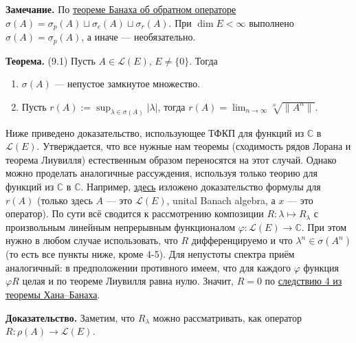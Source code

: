 \documentclass[12pt, a4paper]{article}
\renewcommand{\phi}{\varphi}   %
\begin{document}
\textbf{Замечание.} По \hyperref[th:8-4]{теореме Банаха об обратном операторе} $\sigma(A) = \sigma_p(A) \sqcup \sigma_c(A) \sqcup \sigma_r(A)$. При $\dim E < \infty$ выполнено $\sigma(A) = \sigma_p(A)$, а иначе --- необязательно.

 \label{th:9-1} \textbf{Теорема.} (9.1) Пусть $A \in \mathcal L(E)$, $E \neq \{0\}$.
Тогда
\begin{enumerate}
    \item $\sigma(A)$ --- непустое замкнутое множество.
    \item Пусть $r(A) := \sup_{\lambda \in \sigma(A)} |\lambda|$, тогда $r(A) = \lim_{n \to \infty} \sqrt[n]{\|A^n\|}$.
\end{enumerate}

Ниже приведено доказательство, использующее ТФКП для функций из $\mathbb{C}$ в $\mathcal{L}(E)$. Утверждается, что все нужные нам теоремы (сходимость рядов Лорана и теорема Лиувилля) естественным образом переносятся на этот случай. Однако можно проделать аналогичные рассуждения, используя только теорию для функций из $\mathbb{C}$ в $\mathbb{C}$. Например, \href{https://proofwiki.org/wiki/Gelfand%27s_Spectral_Radius_Formula/Banach_Algebra}{здесь} изложено доказательство формулы для $r(A)$ (только здесь $A$ --- это $\mathcal{L}(E)$, unital Banach algebra, а $x$ --- это оператор). По сути всё сводится к рассмотрению композиции $R: \lambda \mapsto R_\lambda$ с произвольным линейным непрерывным функционалом $\phi: \mathcal{L}(E) \to \mathbb{C}$. При этом нужно в любом случае использовать, что $R$ дифференцируемо и что $\lambda^n \in \sigma(A^n)$ (то есть все пункты ниже, кроме 4-5). Для непустоты спектра приём аналогичный: в предположении противного имеем, что для каждого $\phi$ функция $\phi R$ целая и по теореме Лиувилля равна нулю. Значит, $R = 0$ по \hyperref[th:hahn-banach-coll-4]{следствию 4 из теоремы Хана--Банаха}.

\textbf{Доказательство.}  Заметим, что $R_\lambda$ можно рассматривать, как оператор $R: \rho(A) \to \mathcal L(E)$.
\end{document}
